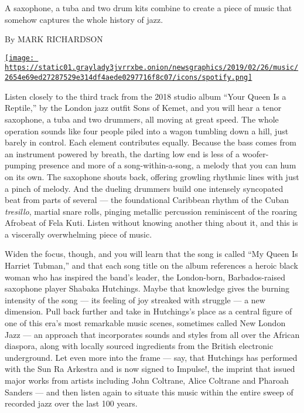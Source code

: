 A saxophone, a tuba and two drum kits combine to create a piece of music
that somehow captures the whole history of jazz.

By MARK RICHARDSON

\href{https://open.spotify.com/track/4dSjQyjl3aHWJpk3swB0ig}{\texttt{[image: https://static01.graylady3jvrrxbe.onion/newsgraphics/2019/02/26/music/2654e69ed27287529e314df4aede0297716f8c07/icons/spotify.png]}}

Listen closely to the third track from the 2018 studio album ``Your
Queen Is a Reptile,'' by the London jazz outfit Sons of Kemet, and you
will hear a tenor saxophone, a tuba and two drummers, all moving at
great speed. The whole operation sounds like four people piled into a
wagon tumbling down a hill, just barely in control. Each element
contributes equally. Because the bass comes from an instrument powered
by breath, the darting low end is less of a woofer-pumping presence and
more of a song-within-a-song, a melody that you can hum on its own. The
saxophone shouts back, offering growling rhythmic lines with just a
pinch of melody. And the dueling drummers build one intensely syncopated
beat from parts of several --- the foundational Caribbean rhythm of the
Cuban \emph{tresillo}, martial snare rolls, pinging metallic percussion
reminiscent of the roaring Afrobeat of Fela Kuti. Listen without knowing
another thing about it, and this is a viscerally overwhelming piece of
music.

Widen the focus, though, and you will learn that the song is called ``My
Queen Is Harriet Tubman,'' and that each song title on the album
references a heroic black woman who has inspired the band's leader, the
London-born, Barbados-raised saxophone player Shabaka Hutchings. Maybe
that knowledge gives the burning intensity of the song --- its feeling
of joy streaked with struggle --- a new dimension. Pull back further and
take in Hutchings's place as a central figure of one of this era's most
remarkable music scenes, sometimes called New London Jazz --- an
approach that incorporates sounds and styles from all over the African
diaspora, along with locally sourced ingredients from the British
electronic underground. Let even more into the frame --- say, that
Hutchings has performed with the Sun Ra Arkestra and is now signed to
Impulse!, the imprint that issued major works from artists including
John Coltrane, Alice Coltrane and Pharoah Sanders --- and then listen
again to situate this music within the entire sweep of recorded jazz
over the last 100 years.


